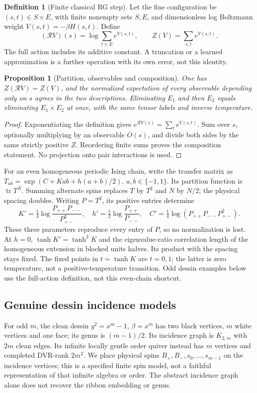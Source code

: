 \documentclass[11pt]{article}
\newtheorem{proposition}[theorem]{Proposition}
\theoremstyle{definition}\newtheorem{definition}[theorem]{Definition}
\theoremstyle{remark}\newtheorem{remark}[theorem]{Remark}
\begin{document}
\begin{definition}[Finite classical RG step]
Let the fine configuration be $(s,t)\in S\times E $, with finite nonempty
sets $ S,E $, and dimensionless log Boltzmann weight $ V(s,t)=-\beta H(s,t)$.
Define
\[
 (\mathcal RV)(s)=\log\sum_{t\in E}e^{V(s,t)},\qquad
 Z(V)=\sum_{s,t}e^{V(s,t)}.
\]
The full action includes its additive constant. A truncation or a learned
approximation is a further operation with its own error, not this identity.
\end{definition}
\begin{proposition}[Partition, observables and composition]\label{rg:exact}
One has $ Z(\mathcal RV)=Z(V)$, and the normalized expectation of every
observable depending only on $ s $ agrees in the two descriptions. Eliminating
$ E_1$ and then $ E_2$ equals eliminating $ E_1\times E_2$ at once, with the
same tensor labels and inverse temperature.
\end{proposition}
\begin{proof}
Exponentiating the definition gives $ e^{\mathcal RV(s)}=\sum_te^{V(s,t)}$.
Sum over $ s $, optionally multiplying by an observable $ O(s)$, and divide
both sides by the same strictly positive $ Z $. Reordering finite sums proves
the composition statement. No projection onto pair interactions is used.
\end{proof}

For an even homogeneous periodic Ising chain, write the transfer matrix as
$ T_{ab}=\exp(C+Kab+h(a+b)/2)$, $ a,b\in\{-1,1\}$.
Its partition function is $\operatorname{tr}T^N $. Summing alternate spins
replaces $ T $ by $ T^2$ and $ N $ by $ N/2$; the physical spacing doubles.
Writing $ P=T^2$, its positive entries determine
\[
 K'=\tfrac 14\log\frac{P_{++}P_{--}}{P_{+-}^2},\quad
 h'=\tfrac 12\log\frac{P_{++}}{P_{--}},\quad
 C'=\tfrac 14\log(P_{++}P_{--}P_{+-}^2).
\]
These three parameters reproduce every entry of $ P $, so no normalization
is lost. At $ h=0$, $\tanh K'=\tanh^2 K $ and the eigenvalue-ratio correlation length of the homogeneous extension
in blocked units halves. Its product with the spacing stays fixed. The
fixed points in $ t=\tanh K $ are $ t=0,1$; the latter is zero temperature,
not a positive-temperature transition. Odd dessin examples below use the
full-action definition, not this even-chain shortcut.

\subsection{Genuine dessin incidence models}
For odd $ m $, the clean dessin $ y^2=x^m-1$, $\beta=x^m $ has two black
vertices, $ m $ white vertices and one face; its genus is $(m-1)/2$.
Its incidence graph is $ K_{2,m}$ with $2 m $ clean edges. Its infinite
locally gentle order quiver instead has $ m $ vertices and completed
DVR-rank $2 m^2$. We place physical spins $ B_+,B_-,s_0,\ldots,s_{m-1}$
on the incidence vertices; this is a specified finite spin model, not a
faithful representation of that infinite algebra or order. The abstract
incidence graph alone does not recover the ribbon embedding or genus.
\end{document}
